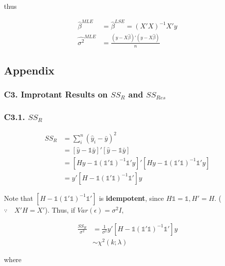 \documentclass[12pt]{article}
\begin{document}
thus 

$$
\begin{aligned}
\hat{\beta}^{MLE} &= \hat{\beta}^{LSE} = (X'X)^{-1}X'y \\[8pt]
\hat{\sigma^2}^{MLE} &= \frac{(y - X\hat{\beta})' (y-X\hat{\beta})}{n}
\end{aligned}
$$


\pagebreak
\subsection*{Appendix}

\subsubsection*{C3. Improtant Results on $SS_R$ and $SS_{Res}$} %


\subsubsection*{C3.1. $SS_R$}

$$
\begin{aligned}
SS_R &= \sum_i^n (\hat{y}_i - \bar{y})^2 \\
&= [\hat{y} - \mathds{1} \bar{y}]' [\hat{y} - \mathds{1} \bar{y}] \\
&= [Hy - \mathds{1} (\mathds{1}' \mathds{1})^{-1} \mathds{1} ' y]' [Hy -  \mathds{1} (\mathds{1}' \mathds{1})^{-1} \mathds{1} ' y] \\
&= y' [H - \mathds{1} (\mathds{1}' \mathds{1})^{-1} \mathds{1} '] y
\end{aligned}
$$

Note that $[H - \mathds{1} (\mathds{1}' \mathds{1})^{-1} \mathds{1} ']$ is \textbf{idempotent}, since $H \mathds{1} = \mathds{1}, H' = H$. ($\because \quad X'H = X'$). Thus, if $Var(\epsilon) = \sigma^2 I$,

$$
\begin{aligned}
\frac{SS_R}{\sigma^2} &= \frac{1}{\sigma^2} y'[H - \mathds{1} (\mathds{1}' \mathds{1})^{-1} \mathds{1}' ] y \\
&\sim \chi^2 (k; \lambda)
\end{aligned}
$$

where 
\end{document}
